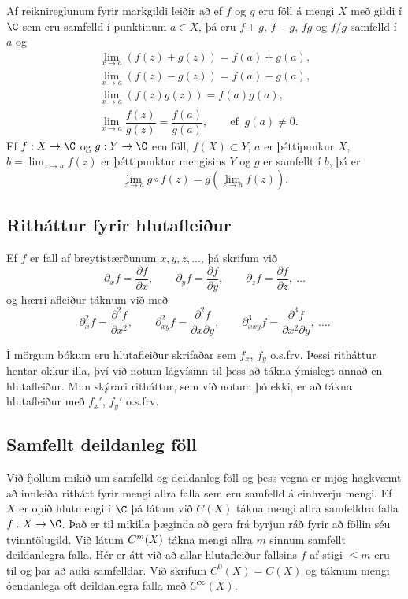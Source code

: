 Af reiknireglunum fyrir markgildi leiðir að ef $f$ og $g$ eru föll
á mengi $X$ með gildi í $\C$ sem eru samfelld í punktinum $a\in X$, þá
eru $f+g$, $f-g$, $fg$ og $f/g$ samfelld í $a$ og 
\begin{gather*}
\lim_{x\to a}(f(z)+g(z))=f(a)+g(a),\\
\lim_{x\to a}(f(z)-g(z))=f(a)-g(a),\\
\lim_{x\to a}(f(z)g(z))=f(a)g(a),\\
\lim_{x\to a}\dfrac{f(z)}{g(z)}=\dfrac{f(a)}{g(a)}, 
\qquad \text{ef } \ g(a)\neq 0.
\end{gather*}
Ef $f:X\to \C$ og $g:Y\to \C$ eru föll,  $f(X)\subset Y$,
$a$ er þéttipunkur $X$, $b=\lim_{z\to a}f(z)$ er
þéttipunktur mengisins $Y$ og $g$ er samfellt í $b$, þá er
$$
\lim_{z\to a} g\circ f(z)=g(\lim_{z\to a}f(z)).
$$


\subsection*{Ritháttur fyrir hlutafleiður}



Ef $f$ er fall af breytistærðunum $x,y,z,\dots$, þá skrifum við
$$
{\partial}_xf=\dfrac{\partial f}{\partial x}, \qquad
{\partial}_yf=\dfrac{\partial f}{\partial y}, \qquad
{\partial}_zf=\dfrac{\partial f}{\partial z}, \ \dots
$$
og hærri afleiður táknum við með
$$
{\partial}_x^2f=\dfrac{\partial^2f}{\partial x^2}, \qquad
{\partial}_{xy}^2f=\dfrac{\partial^2f}{\partial x\partial y}, \qquad
{\partial}_{xxy}^3f=\dfrac{\partial^3f}{\partial x^2\partial y}, \ \dots.
$$

Í mörgum bókum eru hlutafleiður skrifaðar sem $f_{x}$, $f_y$ o.s.frv.
 Þessi
ritháttur hentar okkur illa, því við notum lágvísinn til þess að tákna
ýmislegt annað en hlutafleiður.  Mun skýrari ritháttur, sem við notum
þó ekki,  er að tákna
hlutafleiður með $f_x'$, $f_y'$ o.s.frv.  

\subsection*{Samfellt deildanleg föll}

\medskip\noindent
Við fjöllum mikið  um
samfelld og deildanleg föll  og 
þess vegna er mjög hagkvæmt að innleiða rithátt fyrir mengi allra falla
sem eru samfelld á einhverju mengi.
Ef $X$ er opið hlutmengi í $\C$ þá látum við $C(X)$ tákna mengi
allra samfelldra falla $f:X\to \C$.  Það er til mikilla þæginda að
gera frá byrjun ráð fyrir að föllin séu tvinntölugild.  Við látum
$C\sp m(X)$ tákna mengi allra $m$ sinnum samfellt
deildanlegra falla.
Hér er átt við að allar hlutafleiður fallsins $f$ af stigi $\leq m$
eru til og þar að auki samfelldar.  Við skrifum $C^0(X)=C(X)$ og
táknum mengi óendanlega oft deildanlegra falla með $C^{\infty}(X)$.


